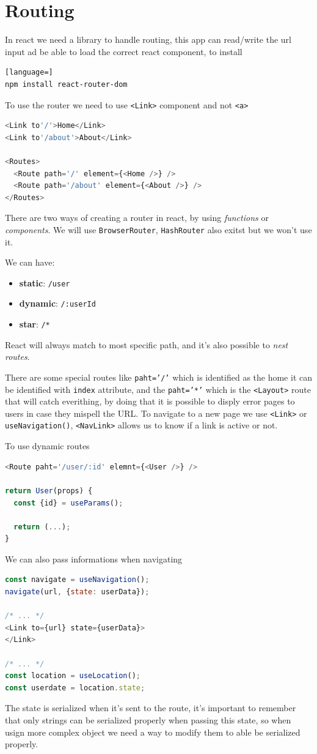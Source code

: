 \documentclass[12pt]{article}
\begin{document}
\newpage
\section{Routing}
In react we need a library to handle routing, this app can read/write the url input ad be able to load the correct react component, to install
\begin{lstlisting}[language=]
npm install react-router-dom
\end{lstlisting}
To use the router we need to use \texttt{<Link>} component and not \texttt{<a>}
\begin{lstlisting}[language=js]
<Link to'/'>Home</Link>
<Link to'/about'>About</Link>

<Routes>
  <Route path='/' element={<Home />} />
  <Route path='/about' element={<About />} />
</Routes>
\end{lstlisting}
There are two ways of creating a router in react, by using \emph{functions} or \emph{components}. We will use \texttt{BrowserRouter}, \texttt{HashRouter} also exitst but we won't use it.

We can have:
\begin{itemize}
  \item \textbf{static}: \texttt{/user}
  \item \textbf{dynamic}: \texttt{/:userId}
  \item \textbf{star}: \texttt{/*}
\end{itemize}
React will always match to most specific path, and it's also possible to \emph{nest routes}.

There are some special routes like \texttt{paht='/'} which is identified as the home it can be identified with \texttt{index} attribute, and the \texttt{paht='*'} which is the \texttt{<Layout>} route that will catch everithing, by doing that it is possible to disply error pages to users in case they mispell the URL. To navigate to a new page we use \texttt{<Link>} or \texttt{useNavigation()}, \texttt{<NavLink>} allows us to know if a link is active or not.

To use dynamic routes
\begin{lstlisting}[language=js]
<Route paht='/user/:id' elemnt={<User />} />

return User(props) {
  const {id} = useParams();
  
  return (...);
}
\end{lstlisting}
We can also pass informations when navigating
\begin{lstlisting}[language=js]
const navigate = useNavigation();
navigate(url, {state: userData});

/* ... */
<Link to={url} state={userData}>
</Link>

/* ... */
const location = useLocation();
const userdate = location.state;
\end{lstlisting}
The state is serialized when it's sent to the route, it's important to remember that only strings can be serialized properly when passing this state, so when usign more complex object we need a way to modify them to able be serialized properly.
\end{document}
